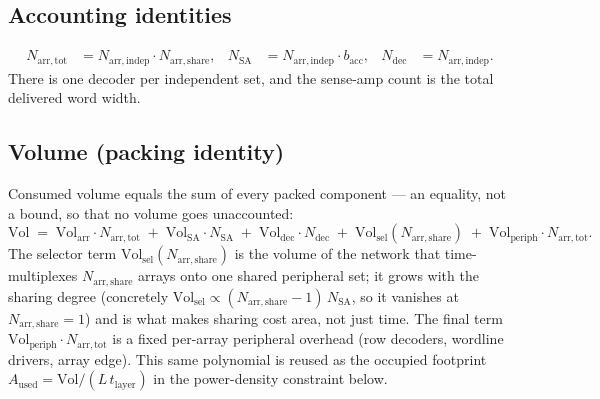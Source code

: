 \documentclass[11pt]{article}
\newcommand{\Nindep}{N_{\mathrm{arr,indep}}}
\newcommand{\Nshare}{N_{\mathrm{arr,share}}}
\newcommand{\Ntot}{N_{\mathrm{arr,tot}}}
\newcommand{\Nsa}{N_{\mathrm{SA}}}
\newcommand{\Ndec}{N_{\mathrm{dec}}}
\newcommand{\Volarr}{\mathrm{Vol}_{\mathrm{arr}}}
\newcommand{\Volsa}{\mathrm{Vol}_{\mathrm{SA}}}
\newcommand{\Voldec}{\mathrm{Vol}_{\mathrm{dec}}}
\newcommand{\Volsel}{\mathrm{Vol}_{\mathrm{sel}}}
\newcommand{\bacc}{b_{\mathrm{acc}}}          %
\newcommand{\Volper}{\mathrm{Vol}_{\mathrm{periph}}}
\newcommand{\Aused}{A_{\mathrm{used}}}
\newcommand{\tlayer}{t_{\mathrm{layer}}}
\begin{document}
\subsection{Accounting identities}
\begin{align}
  \Ntot &= \Nindep\cdot\Nshare, &
  \Nsa  &= \Nindep\cdot\bacc, &
  \Ndec &= \Nindep .
  \label{eq:counts}
\end{align}
There is one decoder per independent set, and the sense-amp count is the total
delivered word width.

\subsection{Volume (packing identity)}
Consumed volume equals the sum of every packed component --- an equality, not a
bound, so that no volume goes unaccounted:
\begin{equation}
  \mathrm{Vol} \;=\;
    \Volarr\cdot\Ntot \;+\;
    \Volsa\cdot\Nsa   \;+\;
    \Voldec\cdot\Ndec \;+\;
    \Volsel(\Nshare) \;+\;
    \Volper\cdot\Ntot .
  \label{eq:vol}
\end{equation}
The selector term $\Volsel(\Nshare)$ is the volume of the network that
time-multiplexes $\Nshare$ arrays onto one shared peripheral set; it grows with
the sharing degree (concretely $\Volsel\propto(\Nshare-1)\,\Nsa$, so it
vanishes at $\Nshare=1$) and is what makes sharing cost area, not just time. The
final term $\Volper\cdot\Ntot$ is a fixed per-array peripheral overhead (row
decoders, wordline drivers, array edge). This same polynomial is reused as the
occupied footprint $\Aused=\mathrm{Vol}/(L\,\tlayer)$ in the power-density
constraint below.
\end{document}
